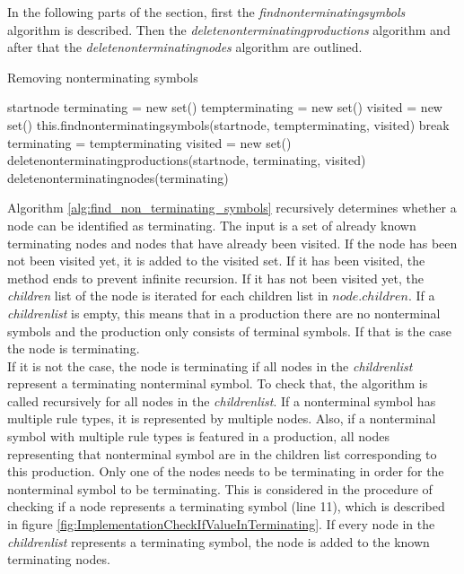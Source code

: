 In the following parts of the section, first the \textit{find\textunderscore non\textunderscore terminating\textunderscore symbols} algorithm is described. Then the \textit{delete\textunderscore non\textunderscore terminating\textunderscore productions} algorithm and after that the \textit{delete\textunderscore non\textunderscore terminating\textunderscore nodes} algorithm are outlined.

\begin{algorithm}[H]
\caption{Removing nonterminating symbols}
\begin{algorithmic}[1] 
\Require start\textunderscore node
\State terminating = new set()
\State temp\textunderscore terminating = new set()
	\State visited = new set()
	\State this.find\textunderscore non\textunderscore terminating\textunderscore symbols(start\textunderscore node, temp\textunderscore terminating, visited)
		\State break
	\Else
		\State terminating = temp\textunderscore terminating
	\EndIf
\EndWhile
\State visited = new set() 
\State delete\textunderscore non\textunderscore terminating\textunderscore productions(start\textunderscore node, terminating, visited)
\State delete\textunderscore non\textunderscore terminating\textunderscore nodes(terminating)
\end{algorithmic}
\label{alg:remove_non_terminating_symbols}
\end{algorithm}

Algorithm \ref{alg:find_non_terminating_symbols}  recursively determines whether a node can be identified as terminating.
The input is a set of already known terminating nodes and nodes that have already been visited.
If the node has been not been visited yet, it is added to the visited set.
If it has been visited, the method ends to prevent infinite recursion.
If it has not been visited yet, the \textit{children} list of the node is iterated for each children list in $node.children$.
If a \textit{children\textunderscore list} is empty, this means that in a production there are no nonterminal symbols and the production only consists of terminal symbols. If that is the case the node is terminating.\\
If it is not the case, the node is terminating if all nodes in the \textit{children\textunderscore list} represent a terminating nonterminal symbol.
To check that, the algorithm is called recursively for all nodes in the \textit{children\textunderscore list}.
If a nonterminal symbol has multiple rule types, it is represented by multiple nodes. Also, if a nonterminal symbol with multiple rule types is featured in a production, all nodes representing that nonterminal symbol are in the children list corresponding to this production. Only one of the nodes needs to be terminating in order for the nonterminal symbol to be terminating.
This is considered in the procedure of checking if a node represents a terminating symbol (line 11), which is described in figure \ref{fig:ImplementationCheckIfValueInTerminating}.
If every node in the \textit{children\textunderscore list} represents a terminating symbol, the node is added to the known terminating nodes.

